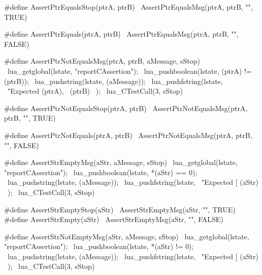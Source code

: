 #define AssertPtrEqualsStop(ptrA, ptrB)    \
  AssertPtrEqualsMsg(ptrA, ptrB, "", TRUE)

#define AssertPtrEquals(ptrA, ptrB)         \
  AssertPtrEqualsMsg(ptrA, ptrB, "", FALSE)
\stopCHeader

\stopTestSuite

\startTestSuite[assertPtrNotEquals]

\startCHeader
#define AssertPtrNotEqualsMsg(ptrA, ptrB, aMessage, sStop) \
  lua_getglobal(lstate, "reportCAssertion");               \
  lua_pushboolean(lstate, (ptrA) != (ptrB));               \
  lua_pushstring(lstate, (aMessage));                      \
  lua_pushfstring(lstate,                                  \
      "Expected %
      (ptrA),                                              \
      (ptrB)                                               \
    );                                                     \
  lua_CTestCall(3, sStop)

#define AssertPtrNotEqualsStop(ptrA, ptrB)    \
  AssertPtrNotEqualsMsg(ptrA, ptrB, "", TRUE)

#define AssertPtrNotEquals(ptrA, ptrB)         \
  AssertPtrNotEqualsMsg(ptrA, ptrB, "", FALSE)
\stopCHeader

\stopTestSuite

\startTestSuite[assertStrEmpty]

\startCHeader
#define AssertStrEmptyMsg(aStr, aMessage, sStop) \
  lua_getglobal(lstate, "reportCAssertion");     \
  lua_pushboolean(lstate, *(aStr) == 0);         \
  lua_pushstring(lstate, (aMessage));            \
  lua_pushfstring(lstate,                        \
      "Expected [%
      (aStr)                                     \
    );                                           \
  lua_CTestCall(3, sStop)

#define AssertStrEmptyStop(aStr)    \
  AssertStrEmptyMsg(aStr, "", TRUE)
#define AssertStrEmpty(aStr)         \
  AssertStrEmptyMsg(aStr, "", FALSE)
\stopCHeader

\stopTestSuite

\startTestSuite[assertStrNotEmpty]

\startCHeader
#define AssertStrNotEmptyMsg(aStr, aMessage, sStop) \
  lua_getglobal(lstate, "reportCAssertion");        \
  lua_pushboolean(lstate, *(aStr) != 0);            \
  lua_pushstring(lstate, (aMessage));               \
  lua_pushfstring(lstate,                           \
      "Expected [%
      (aStr)                                        \
    );                                              \
  lua_CTestCall(3, sStop)

